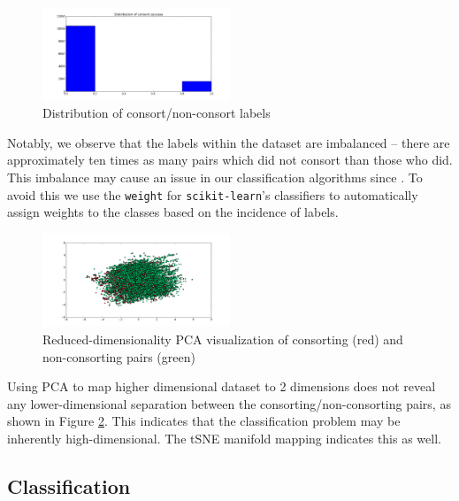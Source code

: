 \documentclass[twoside,twocolumn,paper=letter]{article}
\begin{document}
\begin{figure}[h]
      \centering
          \includegraphics[width=0.5\textwidth]{../figs/consort_distrib.png}
  \caption{Distribution of consort/non-consort labels}
  \label{fig:label_distrib}
\end{figure}
Notably, we observe that the labels within the dataset are imbalanced -- there
are approximately ten times as many pairs which did not consort than those who
did. This imbalance may cause an issue in our classification algorithms since .
To avoid this we use the \texttt{weight} for \texttt{scikit-learn}'s classifiers
to automatically assign weights to the classes based on the incidence of
labels.\\
\begin{figure}
      \centering
          \includegraphics[width=0.5\textwidth]{../figs/consort_non_consort_visualization_pca.png}
  \caption{Reduced-dimensionality PCA visualization of consorting (red) and
  non-consorting pairs (green)}
  \label{fig:pca_vis}
\end{figure}
Using PCA to map higher dimensional dataset to 2 dimensions does not reveal
any lower-dimensional separation between the consorting/non-consorting pairs, as
shown in Figure \ref{fig:pca_vis}.
This indicates that the classification problem may be inherently
high-dimensional. The tSNE manifold mapping indicates this as well.
\subsection{Classification}
\end{document}
